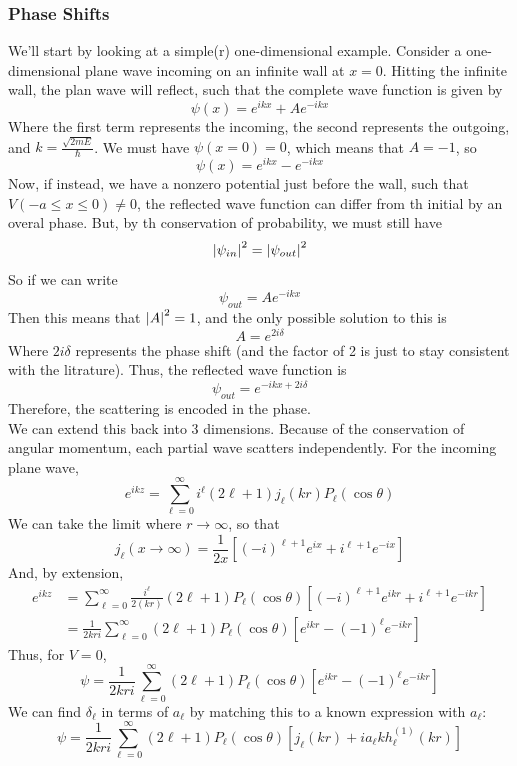 \documentclass[a4paper]{article}
\begin{document}
\subsubsection{Phase Shifts}
We'll start by looking at a simple(r) one-dimensional example. Consider a
one-dimensional plane wave incoming on an infinite wall at $x=0$. Hitting the
infinite wall, the plan wave will reflect, such that the complete wave function
is given by
\[
	\psi(x) = e^{ikx} + A e^{-ikx}
\]
Where the first term represents the incoming, the second represents the
outgoing, and $k=\frac{\sqrt{2mE}}{\hslash}$.
We must have $\psi(x=0) = 0$, which means that $A = -1$, so
\[
	\psi(x) = e^{ikx} - e^{-ikx}
\]
Now, if instead, we have a nonzero potential just before the wall, such that
$V(-a\leq x \leq 0) \neq 0$, the reflected wave function can differ from th
initial by an overal phase. But, by th conservation of probability, we must
still have
\[
	\left\lvert \psi_{in}\right\rvert^2 = \left\lvert \psi_{out}\right\rvert^2
\]
So if we can write
\[
	\psi_{out} = Ae^{-ikx}
\]
Then this means that $\left\lvert A\right\rvert^2 = 1$, and the only possible solution to this is
\[
	A = e^{2i\delta}
\]
Where $2i\delta$ represents the phase shift (and the factor of 2 is just to stay
consistent with the litrature). Thus, the reflected wave function is
\[
	\psi_{out} = e^{-ikx + 2i\delta}
\]
Therefore, the scattering is encoded in the phase.\\
We can extend this back into 3 dimensions. Because of the conservation of
angular momentum, each partial wave scatters independently. For the incoming
plane wave,
\[
	e^{ikz} = \sum_{\ell=0}^{\infty} i^\ell (2\ell+1) j_\ell(kr)
	P_\ell(\cos\theta)
\]
We can take the limit where $r\to\infty$, so that
\[
	j_\ell(x\to\infty) = \frac{1}{2x}\left[
		(-i)^{\ell+1} e^{ix} + i^{\ell+1} e^{-ix}
	\right]
\]
And, by extension,
\begin{align*}
	e^{ikz} &= \sum_{\ell=0}^\infty \frac{i^\ell}{2(kr)}
	(2\ell + 1)P_\ell(\cos\theta) \left[ (-i)^{\ell+1} e^{ikr} +
	i^{\ell+1} e^{-ikr}\right]\\
	&= \frac{1}{2kri} \sum_{\ell=0}^\infty (2\ell+1)P_\ell(\cos\theta)
	\left[e^{ikr} - (-1)^\ell e^{-ikr}\right]
\end{align*}
Thus, for $V=0$,
\[
	\psi = \frac{1}{2kri} \sum_{\ell=0}^\infty (2\ell+1)P_\ell(\cos\theta)
	\left[e^{ikr} - (-1)^\ell e^{-ikr}\right]
\]
We can find $\delta_\ell$ in terms of $a_\ell$ by matching this to a known
expression with $a_\ell$:
\[
	\psi = \frac{1}{2kri} \sum_{\ell=0}^\infty (2\ell+1)P_\ell(\cos\theta)
	\left[j_\ell(kr) + i a_\ell k h_\ell^{(1)}(kr) \right]
\]
\end{document}
